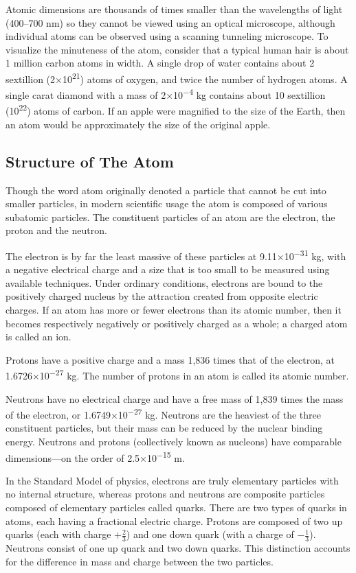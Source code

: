 \documentclass[
]{book}
\begin{document}
Atomic dimensions are thousands of times smaller than the wavelengths of light (400--700 nm) so they cannot be viewed using an optical microscope, although individual atoms can be observed using a scanning tunneling microscope. To visualize the minuteness of the atom, consider that a typical human hair is about 1 million carbon atoms in width. A single drop of water contains about 2 sextillion (2×10\textsuperscript{21}) atoms of oxygen, and twice the number of hydrogen atoms. A single carat diamond with a mass of 2×10\textsuperscript{−4} kg contains about 10 sextillion (10\textsuperscript{22}) atoms of carbon. If an apple were magnified to the size of the Earth, then an atom would be approximately the size of the original apple.

\hypertarget{structure-of-the-atom}{%
\subsection{Structure of The Atom}\label{structure-of-the-atom}}

Though the word atom originally denoted a particle that cannot be cut into smaller particles, in modern scientific usage the atom is composed of various subatomic particles. The constituent particles of an atom are the electron, the proton and the neutron.

The electron is by far the least massive of these particles at 9.11×10\textsuperscript{−31} kg, with a negative electrical charge and a size that is too small to be measured using available techniques. Under ordinary conditions, electrons are bound to the positively charged nucleus by the attraction created from opposite electric charges. If an atom has more or fewer electrons than its atomic number, then it becomes respectively negatively or positively charged as a whole; a charged atom is called an ion.

Protons have a positive charge and a mass 1,836 times that of the electron, at 1.6726×10\textsuperscript{−27} kg. The number of protons in an atom is called its atomic number.

Neutrons have no electrical charge and have a free mass of 1,839 times the mass of the electron, or 1.6749×10\textsuperscript{−27} kg. Neutrons are the heaviest of the three constituent particles, but their mass can be reduced by the nuclear binding energy. Neutrons and protons (collectively known as nucleons) have comparable dimensions---on the order of 2.5×10\textsuperscript{−15} m.

In the Standard Model of physics, electrons are truly elementary particles with no internal structure, whereas protons and neutrons are composite particles composed of elementary particles called quarks. There are two types of quarks in atoms, each having a fractional electric charge. Protons are composed of two up quarks (each with charge \(+\frac{2}{3}\)) and one down quark (with a charge of \(−\frac{1}{3}\)). Neutrons consist of one up quark and two down quarks. This distinction accounts for the difference in mass and charge between the two particles.
\end{document}
